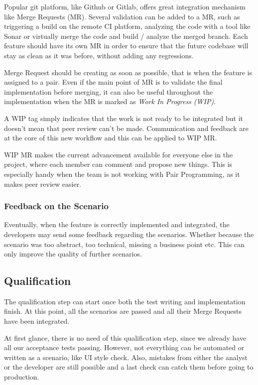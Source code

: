 Popular git platform, like Github or Gitlab, offers great integration
mechanism like Merge Requests (MR).
Several validation can be added to a MR, such as triggering a build on the
remote CI platform, analyzing the code with a tool like Sonar or virtually
merge the code and build / analyze the merged branch.
Each feature should have its own MR in order to ensure that the future
codebase will stay as clean as it was before, without adding any regressions.

Merge Request should be creating as soon as possible, that is when the
feature is assigned to a pair.
Even if the main point of MR is to validate the final implementation before
merging, it can also be useful throughout the implementation when the MR is
marked as \textit{Work In Progress (WIP)}.

A WIP tag simply indicates that the work is not ready to be integrated but
it doesn't mean that peer review can't be made.
Communication and feedback are at the core of this new workflow and this can
be applied to WIP MR\@.

WIP MR makes the current advancement available for everyone else in the
project, where each member can comment and propose new things.
This is especially handy when the team is not working with Pair Programming,
as it makes peer review easier.

\subsubsection{Feedback on the Scenario}
Eventually, when the feature is correctly implemented and integrated, the
developers may send some feedback regarding the scenarios.
Whether because the scenario was too abstract, too technical, missing a
business point etc.
This can only improve the quality of further scenarios.

\subsection{Qualification}\label{subsec:qualification}
The qualification step can start once both the test writing and
implementation finish.
At this point, all the scenarios are passed and all their Merge Requests have
been integrated.

At first glance, there is no need of this qualification step, since we
already have all our acceptance tests passing.
However, not everything can be automated or written as a scenario, like UI
style check.
Also, mistakes from either the analyst or the developer are still possible
and a last check can catch them before going to production.

